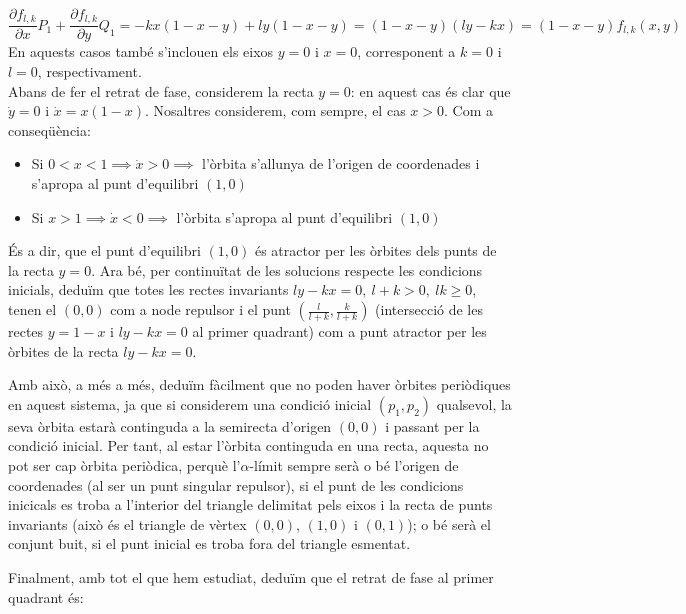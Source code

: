 \documentclass{article}
\begin{document}
$$\frac{\partial f_{l,k}}{\partial x}P_1+\frac{\partial f_{l,k}}{\partial y}Q_1=-kx(1-x-y)+ly(1-x-y)=(1-x-y)(ly-kx)=(1-x-y)f_{l,k}(x,y)$$
En aquests casos també s'inclouen els eixos $y=0$ i $x=0$, corresponent a $k=0$ i $l=0$, respectivament.
\\ 
Abans de fer el retrat de fase, considerem la recta $y=0$: en aquest cas és clar que $\dot{y}=0$ i $\dot{x}=x(1-x)$. Nosaltres considerem, com sempre, el cas $x>0$. Com a conseqüència:
\begin{itemize}
  \item Si $0<x<1 \implies \dot{x}>0 \implies $ l'òrbita s'allunya de l'origen de coordenades i s'apropa al punt d'equilibri $(1, 0)$
  \item Si $x>1 \implies \dot{x}<0 \implies $ l'òrbita s'apropa al punt d'equilibri $(1, 0)$
\end{itemize}
És a dir, que el punt d'equilibri $(1,0)$ és atractor per les òrbites dels punts de la recta $y=0$. Ara bé, per continuïtat de les solucions respecte les condicions inicials, deduïm que totes les rectes invariants $ly-kx=0, \ l+k>0, \ lk\geq 0$, tenen el $(0,0)$ com a node repulsor i el punt $(\frac{l}{l+k}, \frac{k}{l+k})$ (intersecció de les rectes $y=1-x$ i $ly-kx=0$ al primer quadrant) com a punt atractor per les òrbites de la recta $ly-kx=0$. 

Amb  això, a més a més, deduïm fàcilment que no poden haver òrbites periòdiques en aquest sistema, ja que si considerem una condició inicial $(p_1, p_2)$ qualsevol, la seva òrbita estarà continguda a la semirecta d'origen $(0,0)$ i passant per la condició inicial. Per tant, al estar l'òrbita continguda en una recta, aquesta no pot ser cap òrbita periòdica, perquè l'$\alpha$-límit sempre serà o bé l'origen de coordenades (al ser un punt singular repulsor), si el punt de les condicions inicicals es troba a l'interior del triangle delimitat pels eixos i la recta de punts invariants (això és el triangle de vèrtex $(0,0)$, $(1,0)$ i $(0,1)$); o bé serà el conjunt buit, si el punt inicial es troba fora del triangle esmentat. 
\par Finalment, amb tot el que hem estudiat, deduïm que el retrat de fase al primer quadrant és:
\begin{center}
  \begin{minipage}{\linewidth}
    \centering
    
  \end{minipage}
\end{center}
\newpage
\end{document}
